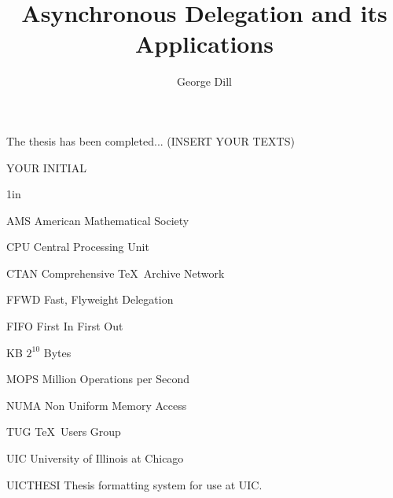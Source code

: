 \documentclass{uicthesi}
\begin{document}

\title{Asynchronous Delegation and its Applications}
\author{George Dill}
\maketitle




 \acknowledgements
{The thesis has been completed... (INSERT YOUR TEXTS)\\ 

\begin{flushright}YOUR INITIAL\end{flushright}}


\preface


\tableofcontents
\listoftables
\listoffigures
\listofabbreviations
\begin{list}
{}
{\setlength
  {}{1in}
    \setlength{\leftmargin}{1.5in}
    \setlength{\labelsep}{.5in}
    \setlength{\rightmargin}{\leftmargin}}
\item[AMS\hfill] American Mathematical Society
\item[CPU\hfill] Central Processing Unit
\item[CTAN\hfill] Comprehensive \TeX\ Archive Network
\item[FFWD\hfill] Fast, Flyweight Delegation
\item[FIFO\hfill] First In First Out
\item[KB\hfill]  $2^{10}$ Bytes
\item[MOPS\hfill] Million Operations per Second
\item[NUMA\hfill] Non Uniform Memory Access
\item[TUG\hfill] \TeX\ Users Group
\item[UIC\hfill] University of Illinois at Chicago
\item[UICTHESI\hfill] Thesis formatting system for use at UIC.
\end{list}
 
\end{document}
